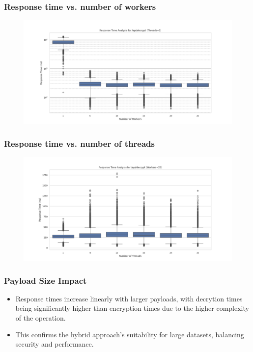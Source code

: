 \documentclass{beamer}
\begin{document}
\begin{frame}
    \frametitle{Response time vs. number of workers}
     \begin{figure}
        \includegraphics[width=\textwidth,height=0.7\textheight,keepaspectratio]{images/phase1/api_decrypt/response_time_threads_1.png}
    \end{figure}
\end{frame}

\begin{frame}
    \frametitle{Response time vs. number of threads}
    \begin{figure}
        \includegraphics[width=\textwidth,height=0.7\textheight,keepaspectratio]{images/phase1/api_decrypt/response_time_workers_25.png}
    \end{figure}
\end{frame}


\begin{frame}
    \frametitle{Payload Size Impact}
    \begin{itemize}
        \item Response times increase linearly with larger payloads, with decrytion times being significantly higher than encryption times due to the higher complexity of the operation.
        \item This confirms the hybrid approach's suitability for large datasets, balancing security and performance.
    \end{itemize}
\end{frame}
\end{document}
